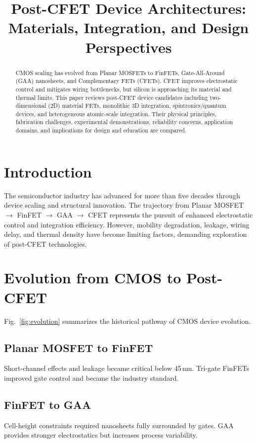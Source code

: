 \documentclass[conference]{IEEEtran}
\title{Post-CFET Device Architectures: Materials, Integration, and Design Perspectives}
\author{
\IEEEauthorblockN{Shinichi Samizo}
\IEEEauthorblockA{Independent Semiconductor Researcher\\
Project Design Hub, Samizo-AITL\\
\textit{Email:} \href{mailto:shin3t72@gmail.com}{shin3t72@gmail.com}\\
\textit{GitHub:} \href{https://github.com/Samizo-AITL}{Samizo-AITL}}
}
\begin{document}
\maketitle

\begin{abstract}
CMOS scaling has evolved from Planar MOSFETs to FinFETs, Gate-All-Around (GAA) nanosheets, and Complementary FETs (CFETs). 
CFET improves electrostatic control and mitigates wiring bottlenecks, but silicon is approaching its material and thermal limits. 
This paper reviews post-CFET device candidates including two-dimensional (2D) material FETs, monolithic 3D integration, spintronics/quantum devices, and heterogeneous atomic-scale integration. 
Their physical principles, fabrication challenges, experimental demonstrations, reliability concerns, application domains, and implications for design and education are compared.
\end{abstract}

\section{Introduction}
The semiconductor industry has advanced for more than five decades through device scaling and structural innovation. 
The trajectory from Planar MOSFET $\rightarrow$ FinFET $\rightarrow$ GAA $\rightarrow$ CFET represents the pursuit of enhanced electrostatic control and integration efficiency. 
However, mobility degradation, leakage, wiring delay, and thermal density have become limiting factors, demanding exploration of post-CFET technologies.

\section{Evolution from CMOS to Post-CFET}
Fig.~\ref{fig:evolution} summarizes the historical pathway of CMOS device evolution.

\subsection{Planar MOSFET to FinFET}
Short-channel effects and leakage became critical below 45\,nm. Tri-gate FinFETs improved gate control and became the industry standard.

\subsection{FinFET to GAA}
Cell-height constraints required nanosheets fully surrounded by gates. GAA provides stronger electrostatics but increases process variability.
\end{document}
